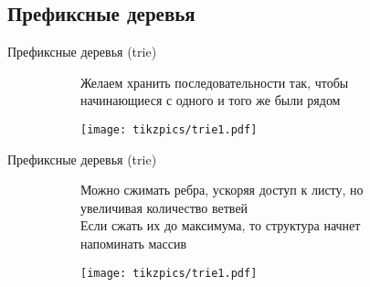 \subsection{Префиксные деревья}

\begin{frame}{Префиксные деревья (trie)}
\begin{figure}[ht]
\begin{subfigure}[t]{.33\textwidth}
Желаем хранить последовательности так, чтобы начинающиеся с одного и того же были рядом
\end{subfigure}\hspace{0em}
\begin{subfigure}[t]{.65\textwidth}
\begin{center}
\texttt{[image: tikzpics/trie1.pdf]}
\end{center}
\end{subfigure}
\end{figure}
\end{frame}

\begin{frame}{Префиксные деревья (trie)}
\begin{figure}[ht]
\begin{subfigure}[t]{.33\textwidth}\vspace{0em}
Можно сжимать ребра, ускоряя доступ к листу, но увеличивая количество ветвей\\%

Если сжать их до максимума, то структура начнет напоминать массив\\

\end{subfigure}\hspace{0em}
\begin{subfigure}[t]{.65\textwidth}\vspace{0em}
\begin{center}
\texttt{[image: tikzpics/trie1.pdf]}
\end{center}
\end{subfigure}
\end{figure}
\end{frame}


